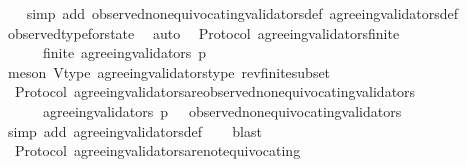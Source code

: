 \begin{isabellebody}
%
\isadelimproof
\ \ %
\endisadelimproof
%
\isatagproof
{}\isamarkupfalse%
\ {\isacharparenleft}simp\ add{\isacharcolon}\ observed{\isacharunderscore}non{\isacharunderscore}equivocating{\isacharunderscore}validators{\isacharunderscore}def\ agreeing{\isacharunderscore}validators{\isacharunderscore}def{\isacharparenright}\isanewline
\ \ \isamarkupfalse%
\ observed{\isacharunderscore}type{\isacharunderscore}for{\isacharunderscore}state\ \isamarkupfalse%
\ auto%
\endisatagproof
{\isafoldproof}%
%
\isadelimproof
\isanewline
%
\endisadelimproof
\isanewline
{}\isamarkupfalse%
\ {\isacharparenleft}\ Protocol{\isacharparenright}\ agreeing{\isacharunderscore}validators{\isacharunderscore}finite\ {\isacharcolon}\isanewline
\ \ {\isachardoublequoteopen}{\isasymforall}\ {\isasymsigma}\ {\isasymin}\ {\isasymSigma}{\isachardot}\ finite\ {\isacharparenleft}agreeing{\isacharunderscore}validators\ {\isacharparenleft}p{\isacharcomma}\ {\isasymsigma}{\isacharparenright}{\isacharparenright}{\isachardoublequoteclose}\isanewline
%
\isadelimproof
\ \ %
\endisadelimproof
%
\isatagproof
{}\isamarkupfalse%
\ {\isacharparenleft}meson\ V{\isacharunderscore}type\ agreeing{\isacharunderscore}validators{\isacharunderscore}type\ rev{\isacharunderscore}finite{\isacharunderscore}subset{\isacharparenright}%
\endisatagproof
{\isafoldproof}%
%
\isadelimproof
\isanewline
%
\endisadelimproof
\isanewline
{}\isamarkupfalse%
\ {\isacharparenleft}\ Protocol{\isacharparenright}\ agreeing{\isacharunderscore}validators{\isacharunderscore}are{\isacharunderscore}observed{\isacharunderscore}non{\isacharunderscore}equivocating{\isacharunderscore}validators\ {\isacharcolon}\isanewline
\ \ {\isachardoublequoteopen}{\isasymforall}\ {\isasymsigma}\ {\isasymin}\ {\isasymSigma}{\isachardot}\ agreeing{\isacharunderscore}validators\ {\isacharparenleft}p{\isacharcomma}\ {\isasymsigma}{\isacharparenright}\ {\isasymsubseteq}\ observed{\isacharunderscore}non{\isacharunderscore}equivocating{\isacharunderscore}validators\ {\isasymsigma}{\isachardoublequoteclose}\isanewline
%
\isadelimproof
\ \ %
\endisadelimproof
%
\isatagproof
{}\isamarkupfalse%
\ {\isacharparenleft}simp\ add{\isacharcolon}\ agreeing{\isacharunderscore}validators{\isacharunderscore}def{\isacharparenright}\isanewline
\ \ \isamarkupfalse%
\ blast%
\endisatagproof
{\isafoldproof}%
%
\isadelimproof
\isanewline
%
\endisadelimproof
\isanewline
{}\isamarkupfalse%
\ {\isacharparenleft}\ Protocol{\isacharparenright}\ agreeing{\isacharunderscore}validators{\isacharunderscore}are{\isacharunderscore}not{\isacharunderscore}equivocating\ {\isacharcolon}\isanewline

\end{isabellebody}
